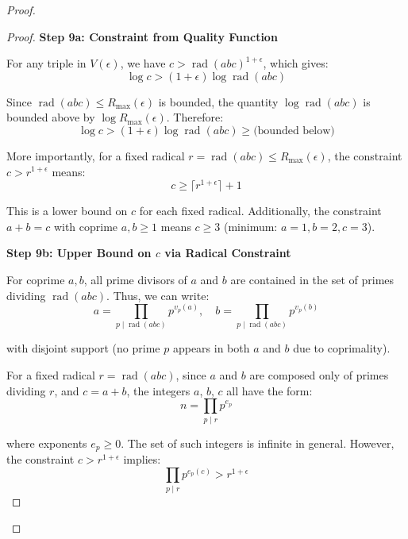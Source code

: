 \begin{proof}
\begin{proof}
\noindent \textbf{Step 9a: Constraint from Quality Function}

For any triple in $V(\epsilon)$, we have $c > \operatorname{rad}(abc)^{1+\epsilon}$, which gives:
\begin{equation}
\log c > (1 + \epsilon) \log \operatorname{rad}(abc)
\end{equation}

Since $\operatorname{rad}(abc) \leq R_{\max}(\epsilon)$ is bounded, the quantity $\log \operatorname{rad}(abc)$ is bounded above by $\log R_{\max}(\epsilon)$. Therefore:
\begin{equation}
\log c > (1 + \epsilon) \log \operatorname{rad}(abc) \geq \text{(bounded below)}
\end{equation}

More importantly, for a fixed radical $r = \operatorname{rad}(abc) \leq R_{\max}(\epsilon)$, the constraint $c > r^{1+\epsilon}$ means:
\begin{equation}
c \geq \lceil r^{1+\epsilon} \rceil + 1
\end{equation}

This is a lower bound on $c$ for each fixed radical. Additionally, the constraint $a + b = c$ with coprime $a, b \geq 1$ means $c \geq 3$ (minimum: $a = 1, b = 2, c = 3$).

\noindent \textbf{Step 9b: Upper Bound on $c$ via Radical Constraint}

For coprime $a, b$, all prime divisors of $a$ and $b$ are contained in the set of primes dividing $\operatorname{rad}(abc)$. Thus, we can write:
\begin{equation}
a = \prod_{p \mid \operatorname{rad}(abc)} p^{v_p(a)}, \quad b = \prod_{p \mid \operatorname{rad}(abc)} p^{v_p(b)}
\end{equation}

with disjoint support (no prime $p$ appears in both $a$ and $b$ due to coprimality).

For a fixed radical $r = \operatorname{rad}(abc)$, since $a$ and $b$ are composed only of primes dividing $r$, and $c = a + b$, the integers $a$, $b$, $c$ all have the form:
\begin{equation}
n = \prod_{p \mid r} p^{e_p}
\end{equation}

where exponents $e_p \geq 0$. The set of such integers is infinite in general. However, the constraint $c > r^{1+\epsilon}$ implies:
\begin{equation}
\prod_{p \mid r} p^{e_p(c)} > r^{1+\epsilon}
\end{equation}


\end{proof}
\end{proof}

